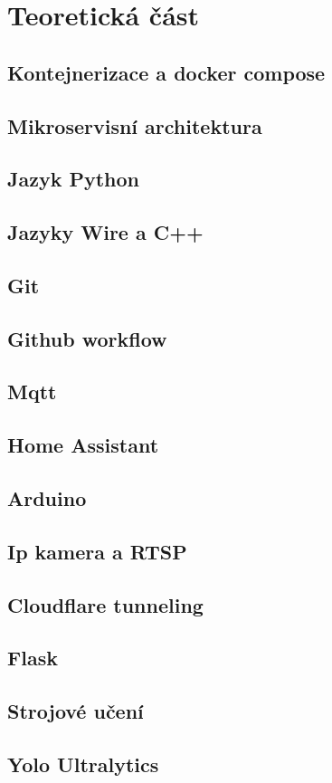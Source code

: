 ﻿\chapter{Teoretická část}
\section{Kontejnerizace a docker compose}
\section{Mikroservisní architektura}
\section{Jazyk Python}
\section{Jazyky Wire a C++ }
\section{Git}
\section{Github workflow}
\section{Mqtt}
\section{Home Assistant}
\section{Arduino}
\section{Ip kamera a RTSP}
\section{Cloudflare tunneling}
\section{Flask}
\section{Strojové učení}
\section{Yolo Ultralytics}

